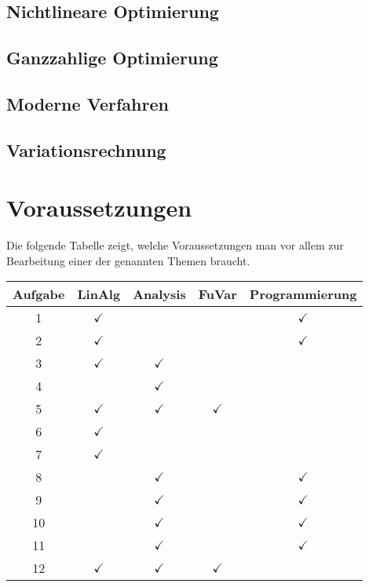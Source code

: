 \documentclass[a4paper,12pt]{article}
\begin{document}
\subsection{Nichtlineare Optimierung}




\subsection{Ganzzahlige Optimierung}


\subsection{Moderne Verfahren}





\subsection{Variationsrechnung}


\section{Voraussetzungen}
Die folgende Tabelle zeigt, welche Voraussetzungen man vor allem
zur Bearbeitung einer der genannten Themen braucht.
\begin{center}
\begin{tabular}{|c|c|c|c|c|}
\hline
Aufgabe&LinAlg&Analysis&FuVar&Programmierung\\
\hline
 1&$\checkmark$&            &            &$\checkmark$\\
 2&$\checkmark$&            &            &$\checkmark$\\
 3&$\checkmark$&$\checkmark$&            &            \\
 4&            &$\checkmark$&            &            \\
 5&$\checkmark$&$\checkmark$&$\checkmark$&            \\
 6&$\checkmark$&            &            &            \\
 7&$\checkmark$&            &            &            \\
 8&            &$\checkmark$&            &$\checkmark$\\
 9&            &$\checkmark$&            &$\checkmark$\\
10&            &$\checkmark$&            &$\checkmark$\\
11&            &$\checkmark$&            &$\checkmark$\\
12&$\checkmark$&$\checkmark$&$\checkmark$&            \\
\hline
\end{tabular}
\end{center}
\end{document}
